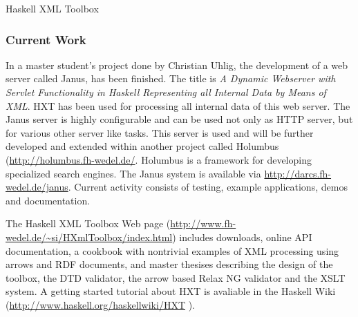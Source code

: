 \begin{hcarentry}{Haskell XML Toolbox}
\subsubsection*{Current Work}

In a master student's project done by Christian Uhlig, the development of a web server called Janus,
has been finished.
The title is \emph{A Dynamic Webserver with Servlet Functionality in
  Haskell Representing all Internal Data by Means of XML}.
HXT has been used for processing all internal data of this web server.
The Janus server is highly configurable and can be used not only as HTTP server, but for
various other server like tasks.
This server is used and will be further developed and extended within another
project called Holumbus (\url{http://holumbus.fh-wedel.de/}.
Holumbus is a framework for developing specialized
search engines.
The Janus system is available via \url{http://darcs.fh-wedel.de/janus}.
Current activity consists of testing, example applications, demos and documentation.

\FurtherReading

The Haskell XML Toolbox Web page
(\url{http://www.fh-wedel.de/~si/HXmlToolbox/index.html})
includes downloads, online API documentation, a cookbook with nontrivial examples
of XML processing using arrows and RDF documents, and master thesises describing the
design of the toolbox, the DTD validator, the arrow based Relax NG
validator and the XSLT system.
A getting started tutorial about HXT is avaliable in the Haskell Wiki (\url{http://www.haskell.org/haskellwiki/HXT}
).
\end{hcarentry}
